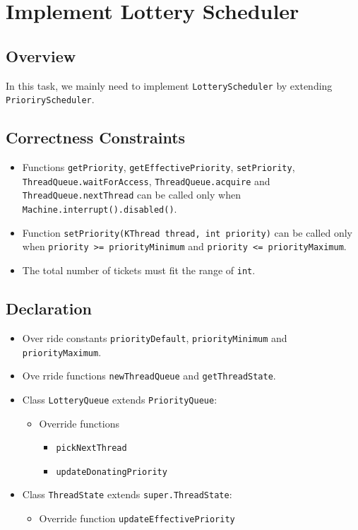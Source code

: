 \documentclass{article}
\begin{document}
\section{Implement Lottery Scheduler}
\subsection{Overview}
In this task, we mainly need to implement \texttt{LotteryScheduler} by extending \texttt{PrioriryScheduler}.
\subsection{Correctness Constraints}
\begin{itemize}
    \item
        Functions \texttt{getPriority}, \texttt{getEffectivePriority}, \texttt{setPriority},
        \texttt{ThreadQueue.waitForAccess}, \texttt{ThreadQueue.acquire} and
        \texttt{ThreadQueue.nextThread} can be called only when \texttt{Machine.interrupt().disabled()}.
    \item
        Function \texttt{setPriority(KThread thread, int priority)} can be called only when
        \texttt{priority >= priorityMinimum} and \texttt{priority <= priorityMaximum}.
    \item
        The total number of tickets must fit the range of \texttt{int}.
\end{itemize}
\subsection{Declaration}
\begin{itemize}
    \item
        Over ride constants \texttt{priorityDefault}, \texttt{priorityMinimum} and \texttt{priorityMaximum}.
    \item
        Ove rride functions \texttt{newThreadQueue} and \texttt{getThreadState}.
    \item
        Class \texttt{LotteryQueue} extends \texttt{PriorityQueue}:
        \begin{itemize}
            \item
                Override functions
                \begin{itemize}
                    \item \texttt{pickNextThread}
                    \item \texttt{updateDonatingPriority}
                \end{itemize}
        \end{itemize}
    \item
        Class \texttt{ThreadState} extends \texttt{super.ThreadState}:
        \begin{itemize}
            \item
                Override function \texttt{updateEffectivePriority}
        \end{itemize}
\end{itemize}
\end{document}
